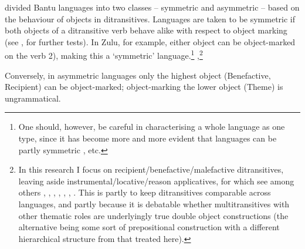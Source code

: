 \documentclass[output=paper
,modfonts
,nonflat]{langsci/langscibook}
\begin{document}
\citet{Bresnan_Moshi1990} divided Bantu languages into two classes – symmetric and asymmetric – based on the behaviour of objects in ditransitives. Languages are taken to be symmetric if both objects of a ditransitive verb behave alike with respect to object marking (see \citealt{Ngonyani1996}, \citealt{Buell2005} for further tests). In Zulu, for example, either object can be object-marked on the verb 2), making this a ‘symmetric’ language.\footnote{One should, however, be careful in characterising a whole language as one type, since it has become more and more evident that languages can be partly symmetric \citep{Schadeberg1995, Rugemalira1991, Thwala2006, Ngonyani1996, Ngonyani_Githinji2006, Riedel2009, Baker1988, Alsina_Mchombo1993, Simango1995, Zeller_Ngoboka2006, Jerro2015, Jerro2016, Van_der_Wal2017a}, etc.}
{,}\footnote{In this research I focus on recipient/benefactive/malefactive ditransitives, leaving aside instrumental/locative/reason applicatives, for which see among others \citet{Kimenyi1980}, \citet{Baker1988}, \citet{Ngonyani1998}, \citet{Moshi1998}, \citet{Alsina_Mchombo1993}, \citet{Ngonyani_Githinji2006}, \citet{Jerro2016}. This is partly to keep ditransitives comparable across languages, and partly because it is debatable whether multitransitives with other thematic roles are underlyingly true double object constructions (the alternative being some sort of prepositional construction with a different hierarchical structure from that treated here).}

Conversely, in asymmetric languages only the highest object (Benefactive, Recipient) can be object-marked; object-marking the lower object (Theme) is ungrammatical.
\end{document}
